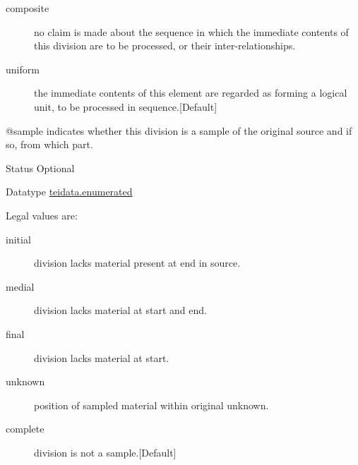 \begin{reflist}
\begin{sansreflist}
\begin{reflist}
\begin{description}
\item[{composite}]no claim is made about the sequence in which the immediate contents of this division are to be processed, or their inter-relationships.
\item[{uniform}]the immediate contents of this element are regarded as forming a logical unit, to be processed in sequence.{[Default] }
\end{description} 
\end{reflist}  
    \item[@sample]
  indicates whether this division is a sample of the original source and if so, from which part.
\begin{reflist}
    \item[{Status}]
  Optional
    \item[{Datatype}]
  \hyperref[TEI.teidata.enumerated]{teidata.enumerated}
    \item[{Legal values are:}]
  \begin{description}

\item[{initial}]division lacks material present at end in source.
\item[{medial}]division lacks material at start and end.
\item[{final}]division lacks material at start.
\item[{unknown}]position of sampled material within original unknown.
\item[{complete}]division is not a sample.{[Default] }
\end{description} 
\end{reflist}  
\end{sansreflist}  
\end{reflist}  
